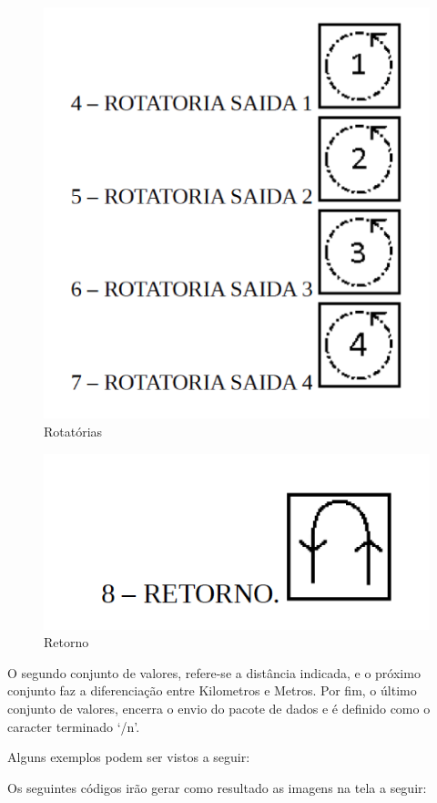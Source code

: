 	\begin{figure}[h!]
		\centering
		\includegraphics[scale=0.60]{rotatorias.png}
		\caption{Rotatórias}
		\label{img:Rotatoria}
	\end{figure}
		
	\begin{figure}[h!]
		\centering
		\includegraphics[scale=0.60]{retorno.png}
		\caption{Retorno}
		\label{img:Retorno}
	\end{figure}
	
	O segundo conjunto de valores, refere-se a distância indicada, e o próximo conjunto faz a diferenciação entre Kilometros e Metros.
	Por fim, o último conjunto de valores, encerra o envio do pacote de dados e é definido como o caracter terminado ‘/n’.
	
	Alguns exemplos podem ser vistos a seguir:
	
	Os seguintes códigos irão gerar como resultado as imagens na tela a seguir:

